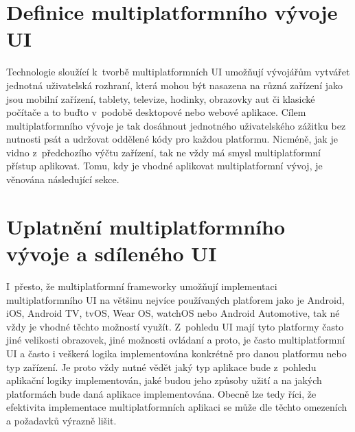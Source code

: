 \begin{sloppypar}
\section{Definice multiplatformního vývoje UI}
Technologie sloužící k~tvorbě multiplatformních UI umožňují vývojářům vytvářet jednotná uživatelská rozhraní, 
která mohou být nasazena na různá zařízení jako jsou mobilní zařízení, tablety, televize, hodinky, obrazovky aut či 
klasické počítače a to buďto v~podobě desktopové nebo webové aplikace. Cílem multiplatformního vývoje je tak dosáhnout jednotného 
uživatelského zážitku bez nutnosti psát a udržovat oddělené kódy pro každou platformu. Nicméně, jak je vidno z~předchozího výčtu zařízení, 
tak ne vždy má smysl multiplatformní přístup aplikovat. Tomu, kdy je vhodné aplikovat multiplatformní vývoj, je věnována následující sekce.  
\end{sloppypar}


\section{Uplatnění multiplatformního vývoje a sdíleného UI}
I~přesto, že multiplatformní frameworky umožňují implementaci multiplatformního UI na většinu nejvíce používaných platforem jako je Android, iOS,
Android TV, tvOS, Wear OS, watchOS nebo Android Automotive, tak né vždy je vhodné těchto možností využít. Z~pohledu UI mají tyto platformy často jiné 
velikosti obrazovek, jiné možnosti ovládaní a proto, je často multiplatformní UI a často i veškerá logika implementována konkrétně pro danou platformu
nebo typ zařízení. Je proto vždy nutné vědět jaký typ aplikace bude z~pohledu aplikační logiky implementován, jaké budou jeho způsoby užití a na jakých 
platformách bude daná aplikace implementována.
Obecně lze tedy říci, že efektivita implementace multiplatformních aplikaci se může dle těchto omezeních a požadavků výrazně lišit.


